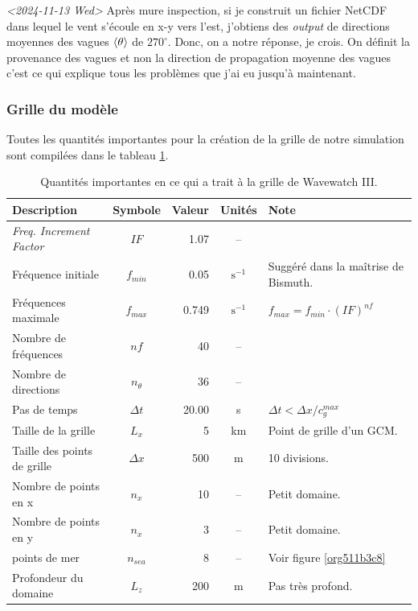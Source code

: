 \documentclass[10pt]{article}
\numberwithin{equation}{section}
\begin{document}
\textit{<2024-11-13 Wed> } Après mure inspection, si je construit un fichier NetCDF dans lequel le vent s'écoule en x-y vers l'est, j'obtiens des \emph{output} de directions moyennes des vagues \(\expval{\theta}\) de \(270^\circ\). Donc, on a notre réponse, je crois. On définit la provenance des vagues et non la direction de propagation moyenne des vagues c'est ce qui explique tous les problèmes que j'ai eu jusqu'à maintenant.
\subsubsection{Grille du modèle}
\label{sec:org0c3fa5d}

Toutes les quantités importantes pour la création de la grille de notre simulation sont compilées dans le tableau \ref{tab:orgd0ec2a1}. 

\begin{table}[!h]
\caption{\label{tab:orgd0ec2a1}Quantités importantes en ce qui a trait à la grille de Wavewatch III.}
\centering
\begin{tabular}{lcrcl}
\hline
\hline
Description & Symbole & Valeur & Unités & Note\\
\hline
\emph{Freq. Increment Factor} & \(IF\) & 1.07 & -- & \autocite[Voir][switch NL2]{wwiii2016user}\\
Fréquence initiale & \(f_{min}\) & 0.05 & \(\mathrm{s}^{-1}\) & Suggéré dans la maîtrise de Bismuth.\\
Fréquences maximale & \(f_{max}\) & 0.749 & \(\mathrm{s}^{-1}\) & \(f_{max} = f_{min}\cdot(IF)^{nf}\)\\
Nombre de fréquences & \(nf\) & 40 & -- & \autocite[Voir][switch NL2]{wwiii2016user}\\
Nombre de directions & \(n_\theta\) & 36 & -- & \autocite[Voir][switch NL2]{wwiii2016user}\\
Pas de temps & \(\Delta t\) & 20.00 & s & \(\Delta t < \Delta x/c^{max}_g\)\\
\hline
Taille de la grille & \(L_x\) & 5 & km & Point de grille d'un GCM.\\
Taille des points de grille & \(\Delta x\) & 500 & m & 10 divisions.\\
Nombre de points en x & \(n_x\) & 10 & -- & Petit domaine.\\
Nombre de points en y & \(n_x\) & 3 & -- & Petit domaine.\\
points de mer & \(n_{sea}\) & 8 & -- & Voir figure \ref{org511b3c8}\\
Profondeur du domaine & \(L_z\) & 200 & m & Pas très profond.\\
\hline
\end{tabular}
\end{table}
\end{document}
